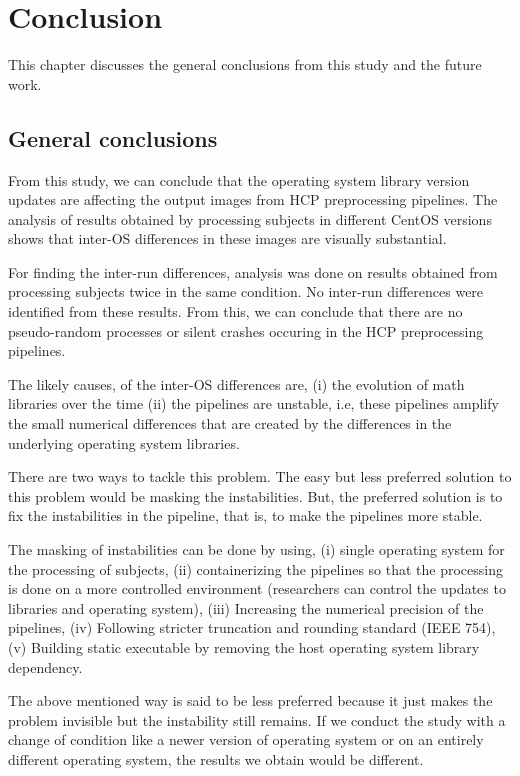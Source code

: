 \chapter{Conclusion}\label{conclusion}
This chapter discusses the general conclusions from this study and the future work.

\section{General conclusions}
From this study, we can conclude that the operating system library version updates are affecting the output images from HCP preprocessing pipelines. The analysis of results obtained by processing subjects in different CentOS versions shows that inter-OS differences in these images are visually substantial.

For finding the inter-run differences, analysis was done on results obtained from processing subjects twice in the same condition. No inter-run differences were identified from these results. From this, we can conclude that there are no pseudo-random processes or silent crashes occuring in the HCP preprocessing pipelines.

The likely causes, of the inter-OS differences are, (i) the evolution of math libraries over the time (ii) the pipelines are unstable, i.e, these pipelines amplify the small numerical differences that are created by the differences in the underlying operating system libraries.

There are two ways to tackle this problem. The easy but less preferred solution to this problem would be masking the instabilities. But, the preferred solution is to fix the instabilities in the pipeline, that is, to make the pipelines more stable.

The masking of instabilities can be done by using, (i) single operating system for the processing of subjects, (ii) containerizing the pipelines so that the processing is done on a more controlled environment (researchers can control the updates to libraries and operating system), (iii) Increasing the numerical precision of the pipelines, (iv) Following stricter truncation and rounding standard (IEEE 754), (v) Building static executable by removing the host operating system library dependency.

The above mentioned way is said to be less preferred because it just makes the problem invisible but the instability still remains. If we conduct the study with a change of condition like a newer version of operating system or on an entirely different operating system, the results we obtain would be different.

